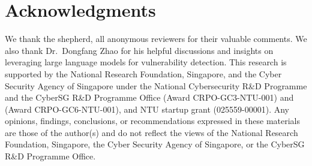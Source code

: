 \section*{Acknowledgments}
We thank the shepherd, all anonymous reviewers for their valuable comments. We also thank Dr.~Dongfang Zhao for his helpful discussions and insights on leveraging large language models for vulnerability detection. This research is supported by the National Research Foundation, Singapore, and the Cyber Security Agency of Singapore under the National Cybersecurity R\&D Programme and the CyberSG R\&D Programme Office (Award CRPO-GC3-NTU-001) and (Award CRPO-GC6-NTU-001), and NTU startup grant (025559-00001). Any opinions, findings, conclusions, or recommendations expressed in these materials are those of the author(s) and do not reflect the views of the National Research Foundation, Singapore, the Cyber Security Agency of Singapore, or the CyberSG R\&D Programme Office.



